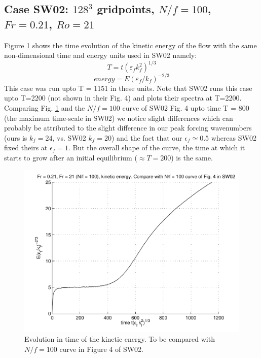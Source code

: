 \documentclass[12pt]{article}
\begin{document}
\subsection{Case SW02: $128^3$ gridpoints, $N/f = 100$, $Fr = 0.21$, $Ro = 21$} 
Figure \ref{NF100_time} shows the time evolution of the kinetic energy of the flow with the same non-dimensional time and energy units used in SW02 namely:
$$T = t(\varepsilon_f k_f^2)^{1/3}$$
$$energy = E(\varepsilon_f/k_f)^{-2/3}$$
This case was run upto T = 1151 in these units. Note that SW02
runs this case upto T=2200 (not shown in their Fig. 4) and plots their
spectra at T=2200. Comparing Fig. \ref{NF100_time} and the $N/f = 100$
curve of SW02 Fig. 4 upto time T = 800 (the maximum time-scale in
SW02) we notice slight differences which can probably be attributed to
the slight difference in our peak forcing wavenumbers (ours is
$k_f=24$, vs. SW02 $k_f=20$) and the fact that our $\epsilon_f \simeq
0.5$ whereas SW02 fixed theirs at $\epsilon_f = 1$. But the overall
shape of the curve, the time at which it starts to grow after an
initial equilibrium ($\approx T = 200$) is the same.
\begin{figure}[ht]
\centering
  \includegraphics[scale = 0.5]{Comp_SW02_fig4_Nf100}
\caption{Evolution in time of the kinetic energy. To be compared with $N/f = 100$ curve in Figure 4 of SW02.\label{NF100_time}}
\end{figure}
\end{document}
